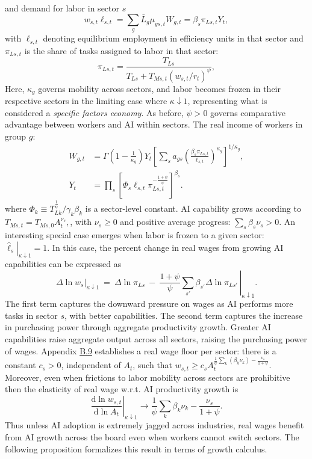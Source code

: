 \documentclass[11pt]{article}
\begin{document}
and demand for labor in sector $s$
\[
w_{s,t}\ell_{s,t}=\sum_{g}\bar{L}_{g}\mu_{gs,t}W_{g,t}=\beta_{s}\pi_{Ls,t}Y_{t},
\]
with $\ell_{s,t}$ denoting equilibrium employment in efficiency units
in that sector and $\pi_{Ls,t}$ is the share of tasks assigned to
labor in that sector:
\[
\ensuremath{\pi_{Ls,t}=\frac{T_{Ls}}{T_{Ls}+T_{Ms,t}(w_{s,t}/r_{t})^{\psi}},}
\]
Here, $\kappa_{g}$ governs mobility across sectors, and labor becomes
frozen in their respective sectors in the limiting case where $\kappa\downarrow1$,
representing what is considered a \emph{specific factors economy}.
As before, $\psi>0$ governs comparative advantage between workers
and AI within sectors. The real income of workers in group $g$:
\[
\begin{aligned}W_{g,t} & =\Gamma\left(1-\frac{1}{\kappa_{g}}\right)Y_{t}\left[\sum_{s}a_{gs}\left(\frac{\beta_{s}\pi_{Ls,t}}{\ell_{s,t}}\right)^{\kappa_{g}}\right]^{1/\kappa_{g}},\\
Y_{t} & =\prod_{s}\left[\Phi_{s}\ell_{s,t}\pi^{-\frac{1+\psi}{\psi}}_{Ls,t}\right]^{\beta_{s}}.
\end{aligned}
\]
where $\Phi_{k}\equiv T^{\frac{1}{\psi}}_{Lk}/\gamma_{k}\beta_{k}$
is a sector-level constant. AI capability grows according to $T_{Ms,t}=T_{Ms,0}A^{\nu_{s}}_{t},$,
with $\nu_{s}\geq0$ and positive average progress: $\sum_{s}\beta_{s}\nu_{s}>0$.
An interesting special case emerges when labor is frozen to a given
sector: $\left.\hat{\ell}_{s}\right|_{\kappa\downarrow1}=1$. In this
case, the percent change in real wages from growing AI capabilities
can be expressed as
\[
\left.\Delta\ln w_{s}\right|_{\kappa\downarrow1}\ =\ \left.\Delta\ln\pi_{Ls}\ -\ \frac{1+\psi}{\psi}\sum_{s'}\beta_{s'}\Delta\ln\pi_{Ls'}\,\right|_{\kappa\downarrow1}.
\]
The first term captures the downward pressure on wages as AI performs
more tasks in sector $s$, with better capabilities. The second term
captures the increase in purchasing power through aggregate productivity
growth. Greater AI capabilities raise aggregate output across all
sectors, raising the purchasing power of wages. Appendix \href{https://ahmadlp.github.io/Lashkaripour_AI_Displacement_Online_Appendix.pdf\#page=47}{B.9}
establishes a real wage floor per sector: there is a constant $c_{s}>0$,
independent of $A_{t}$, such that $w_{s,t}\geq c_{s}A^{\frac{1}{\psi}\sum_{k}(\beta_{k}\nu_{k})-\frac{\nu_{s}}{1+\psi}}_{t}$.
Moreover, even when frictions to labor mobility across sectors are
prohibitive then the elasticity of real wage w.r.t. AI productivity
growth is
\[
\left.\frac{\mathrm{d}\ln w_{s,t}}{\mathrm{d}\ln A_{t}}\right|_{\kappa\downarrow1}\longrightarrow\frac{1}{\psi}\sum_{k}\beta_{k}\nu_{k}-\frac{\nu_{s}}{1+\psi}.
\]
Thus unless AI adoption is extremely jagged across industries, real
wages benefit from AI growth across the board even when workers cannot
switch sectors. The following proposition formalizes this result in
terms of growth calculus.
\end{document}
